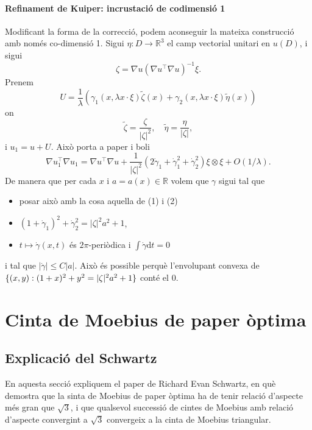 \documentclass[11pt,a4paper,openright,oneside]{book}
\DeclarePairedDelimiter{\set}{\{}{\}}
\numberwithin{equation}{section}
\theoremstyle{definition}
\begin{document}
\subsubsection{Refinament de Kuiper: incrustació de codimensió 1}
Modificant la forma de la correcció, podem aconseguir la mateixa construcció amb només co-dimensió 1. Sigui $\eta:D\to\mathbb R^{3}$ el camp vectorial unitari en $u(D)$, i sigui
$$\zeta = \nabla u (\nabla u^\intercal \nabla u)^{-1}\xi.$$
Prenem 
$$U = \frac1\lambda \left( \gamma_{1}(x, \lambda x \cdot \xi)\tilde{\zeta}(x) + \gamma_{2}(x, \lambda x \cdot \xi)\tilde{\eta}(x) \right)$$
on 
$$\tilde{\zeta} = \frac{\zeta}{|\zeta|^2}, \quad \tilde{\eta} = \frac{\eta}{|\zeta|},$$
i $u_1 = u + U$. Això porta a 
{\color{blue} paper i boli}
$$\nabla u_1^\intercal \nabla u_1 = \nabla u^\intercal \nabla u +\frac{1}{|\zeta|^2}\left( 2\dot\gamma_{1} + \dot\gamma_1^2 + \dot\gamma_{2}^2 \right) \xi \otimes \xi + O(1/\lambda).$$
De manera que per cada $x$ i $a=a(x)\in\mathbb R$ volem que $\gamma$ sigui tal que
\begin{itemize}
    \item {\color{blue} posar això amb la cosa aquella de (1) i (2)}
    \item $(1+\dot\gamma_1)^2+\dot\gamma_2^2=|\zeta|^2a^2+1$,
    \item $t \mapsto \dot\gamma(x,t)$ és $2\pi$-periòdica i $\int\dot\gamma\textrm{d}t=0$
\end{itemize}
i tal que $|\dot\gamma|\le C|a|$. Això és possible perquè l'envolupant convexa de $\set{(x,y):(1+x)^2+y^2 = |\zeta|^2a^2+1}$ conté el $0$. 




\newpage
\chapter{Cinta de Moebius de paper òptima}
\section{Explicació del Schwartz}
{\color{blue}En aquesta secció expliquem el paper de Richard Evan Schwartz, en què demostra que la sinta de Moebius de paper òptima ha de tenir relació d'aspecte més gran que $\sqrt{3}$, i que qualsevol successió de cintes de Moebius amb relació d'aspecte convergint a $\sqrt{3}$ convergeix a la cinta de Moebius triangular.}
\end{document}
